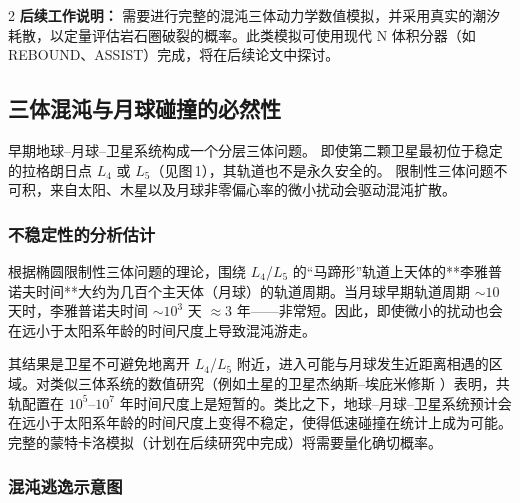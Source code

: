 \documentclass[11pt,a4paper]{article}
\begin{document}
\begin{multicols}{2}
		\vspace{0.2cm}
		\noindent
		\textbf{后续工作说明：} 需要进行完整的混沌三体动力学数值模拟，并采用真实的潮汐耗散，以定量评估岩石圈破裂的概率。此类模拟可使用现代 N 体积分器（如 REBOUND、ASSIST）完成，将在后续论文中探讨。
		
		
		\subsection{三体混沌与月球碰撞的必然性}
		
		早期地球–月球–卫星系统构成一个分层三体问题。
		即使第二颗卫星最初位于稳定的拉格朗日点
		\(L_4\) 或 \(L_5\)（见图 1），其轨道也不是永久安全的。
		限制性三体问题不可积，来自太阳、木星以及月球非零偏心率的微小扰动会驱动混沌扩散。
		
		\subsubsection{不稳定性的分析估计}
		
		根据椭圆限制性三体问题的理论，围绕 \(L_4\)/\(L_5\) 的“马蹄形”轨道上天体的**李雅普诺夫时间**大约为几百个主天体（月球）的轨道周期。当月球早期轨道周期 \(\sim 10\) 天时，李雅普诺夫时间 \(\sim 10^{3}\) 天 \(\approx 3\) 年——非常短。因此，即使微小的扰动也会在远小于太阳系年龄的时间尺度上导致混沌游走。
		
		其结果是卫星不可避免地离开 \(L_4\)/\(L_5\) 附近，进入可能与月球发生近距离相遇的区域。对类似三体系统的数值研究（例如土星的卫星杰纳斯–埃庇米修斯 \cite{JanusEpimetheus}）表明，共轨配置在 \(10^{5}\)–\(10^{7}\) 年时间尺度上是短暂的。类比之下，地球–月球–卫星系统预计会在远小于太阳系年龄的时间尺度上变得不稳定，使得低速碰撞在统计上成为可能。完整的蒙特卡洛模拟（计划在后续研究中完成）将需要量化确切概率。
		
		\subsubsection{混沌逃逸示意图}
		

\end{multicols}
\end{document}
